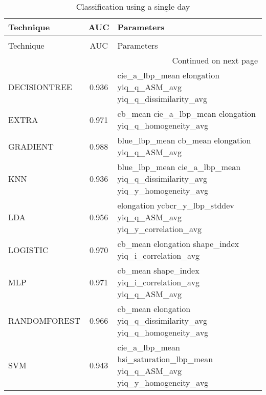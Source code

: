 \begin{longtable}{lcl}
\caption[Classification using a single day]{Classification using a single day}
\label{table:results-single-day}\\
\toprule
Technique &   AUC &                                                                 Parameters \\
\midrule
\endfirsthead
\caption[]{Classification using a single day} \\
\toprule
Technique &   AUC &                                                                 Parameters \\
\midrule
\endhead
\midrule
\multicolumn{3}{r}{{Continued on next page}} \\
\midrule
\endfoot

\bottomrule
\endlastfoot
DECISIONTREE & 0.936  & \begin{minipage}[t]{0.5\textwidth} cie\_a\_lbp\_mean elongation yiq\_q\_ASM\_avg yiq\_q\_dissimilarity\_avg \end{minipage} \\
\midrule
EXTRA & 0.971 &  \begin{minipage}[t]{0.5\textwidth} cb\_mean cie\_a\_lbp\_mean elongation yiq\_q\_homogeneity\_avg \end{minipage} \\
\midrule
GRADIENT & 0.988 &  \begin{minipage}[t]{0.5\textwidth}  blue\_lbp\_mean cb\_mean elongation yiq\_q\_ASM\_avg \end{minipage} \\
\midrule
KNN & 0.936 &  \begin{minipage}[t]{0.5\textwidth} blue\_lbp\_mean cie\_a\_lbp\_mean yiq\_q\_dissimilarity\_avg yiq\_y\_homogeneity\_avg \end{minipage} \\
\midrule
LDA & 0.956 &  \begin{minipage}[t]{0.5\textwidth} elongation ycbcr\_y\_lbp\_stddev yiq\_q\_ASM\_avg yiq\_y\_correlation\_avg \end{minipage} \\
\midrule
LOGISTIC & 0.970 &  \begin{minipage}[t]{0.5\textwidth} cb\_mean elongation shape\_index yiq\_i\_correlation\_avg \end{minipage} \\
\midrule
MLP & 0.971 &  \begin{minipage}[t]{0.5\textwidth} cb\_mean shape\_index yiq\_i\_correlation\_avg yiq\_q\_ASM\_avg \end{minipage} \\
\midrule
RANDOMFOREST & 0.966 &  \begin{minipage}[t]{0.5\textwidth}  cb\_mean elongation yiq\_q\_dissimilarity\_avg yiq\_q\_homogeneity\_avg \end{minipage} \\
\midrule
SVM & 0.943 &  \begin{minipage}[t]{0.5\textwidth} cie\_a\_lbp\_mean hsi\_saturation\_lbp\_mean yiq\_q\_ASM\_avg yiq\_y\_homogeneity\_avg \end{minipage} \\
\end{longtable}
